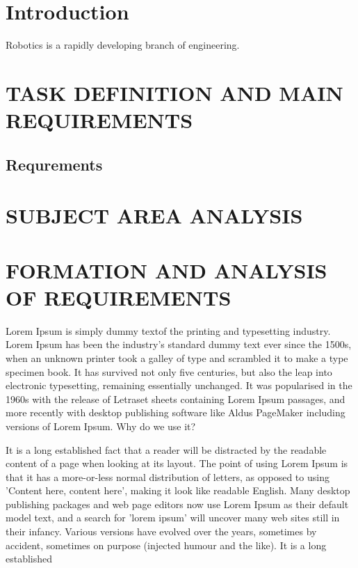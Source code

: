 
\section*{Introduction}
Robotics is a rapidly developing branch of engineering.

\section{TASK DEFINITION AND MAIN REQUIREMENTS}
\subsection{Requrements}
\section{SUBJECT AREA ANALYSIS}

\citep{progit}
\section{FORMATION AND ANALYSIS OF REQUIREMENTS}
Lorem Ipsum is simply dummy textof the printing and typesetting industry. Lorem Ipsum has been the industry's standard dummy text ever since the 1500s, when an unknown printer took a galley of type and scrambled it to make a type specimen book. It has survived not only five centuries, but also the leap into electronic typesetting, remaining essentially unchanged. It was popularised in the 1960s with the release of Letraset sheets containing Lorem Ipsum passages, and more recently with desktop publishing software like Aldus PageMaker including versions of Lorem Ipsum.
Why do we use it?

It is a long established fact that a reader will be distracted by the readable content of a page when looking at its layout. The point of using Lorem Ipsum is that it has a more-or-less normal distribution of letters, as opposed to using 'Content here, content here', making it look like readable English. Many desktop publishing packages and web page editors now use Lorem Ipsum as their default model text, and a search for 'lorem ipsum' will uncover many web sites still in their infancy. Various versions have evolved over the years, sometimes by accident, sometimes on purpose (injected humour and the like).
It is a long established \citep{ppmodel}

